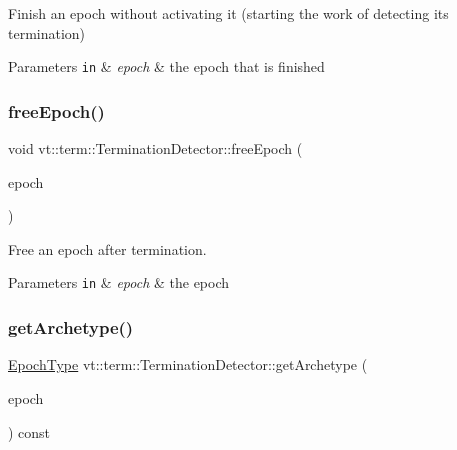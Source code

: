 Finish an epoch without activating it (starting the work of detecting its termination) 


\begin{DoxyParams}[1]{Parameters}
\mbox{\tt in}  & {\em epoch} & the epoch that is finished \\
\hline
\end{DoxyParams}
\mbox{\label{structvt_1_1term_1_1_termination_detector_a3b1e4a0d87c5af08fc36925ec74504fd}} 
\subsubsection{\texorpdfstring{free\+Epoch()}{freeEpoch()}}
{\footnotesize\ttfamily void vt\+::term\+::\+Termination\+Detector\+::free\+Epoch (\begin{DoxyParamCaption}\item[{\hyperlink{namespacevt_a985a5adf291c34a3ca263b3378388236}{Epoch\+Type} const \&}]{epoch }\end{DoxyParamCaption})}



Free an epoch after termination. 


\begin{DoxyParams}[1]{Parameters}
\mbox{\tt in}  & {\em epoch} & the epoch \\
\hline
\end{DoxyParams}
\mbox{\label{structvt_1_1term_1_1_termination_detector_ad812a021139b95077ff0168611401334}} 
\subsubsection{\texorpdfstring{get\+Archetype()}{getArchetype()}}
{\footnotesize\ttfamily \hyperlink{namespacevt_a985a5adf291c34a3ca263b3378388236}{Epoch\+Type} vt\+::term\+::\+Termination\+Detector\+::get\+Archetype (\begin{DoxyParamCaption}\item[{\hyperlink{namespacevt_a985a5adf291c34a3ca263b3378388236}{Epoch\+Type} const \&}]{epoch }\end{DoxyParamCaption}) const\hspace{0.3cm}{\ttfamily [private]}}



